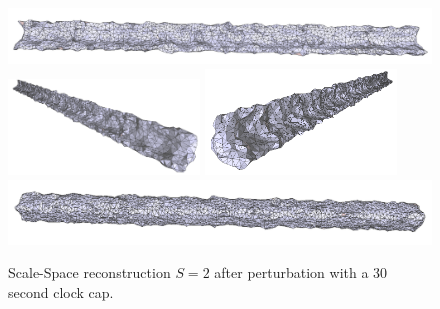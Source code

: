 \documentclass[12pt]{drexelthesis}
\begin{document}
\begin{figure}[!ht]
	
	\centering
		\includegraphics[width=5in]{simulated-lab-scan/2cmnoise/optimizedNeat/scalespace2perturb00.png}
		\includegraphics[width=2in]{simulated-lab-scan/2cmnoise/optimizedNeat/scalespace2perturb01.png}
		\includegraphics[width=2in]{simulated-lab-scan/2cmnoise/optimizedNeat/scalespace2perturb02.png}
		\includegraphics[width=5in]{simulated-lab-scan/2cmnoise/optimizedNeat/scalespace2perturb03.png}
		\caption[Scale-Space reconstruction $S = 2$ after perturbation with a 30 second clock cap]{\centering Scale-Space reconstruction $S = 2$ after perturbation with a 30 second clock cap.}
	\label{2cmnoise:scalespace2perturb}
\end{figure}

\end{document}
